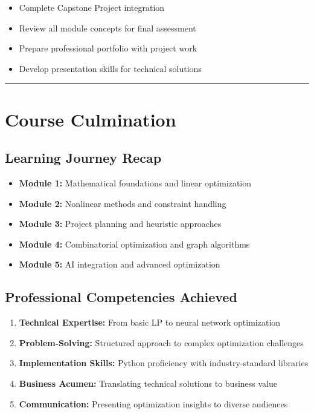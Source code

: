 \documentclass[
  letterpaper,
  DIV=11,
  numbers=noendperiod]{scrreprt}
\providecommand{\tightlist}{%
  \setlength{\itemsep}{0pt}\setlength{\parskip}{0pt}}
\begin{document}
\begin{itemize}
\tightlist
\item
  Complete Capstone Project integration
\item
  Review all module concepts for final assessment
\item
  Prepare professional portfolio with project work
\item
  Develop presentation skills for technical solutions
\end{itemize}

\begin{center}\rule{0.5\linewidth}{0.5pt}\end{center}

\section{Course Culmination}\label{course-culmination}

\subsection{Learning Journey Recap}\label{learning-journey-recap}

\begin{itemize}
\tightlist
\item
  \textbf{Module 1:} Mathematical foundations and linear optimization
\item
  \textbf{Module 2:} Nonlinear methods and constraint handling
\item
  \textbf{Module 3:} Project planning and heuristic approaches
\item
  \textbf{Module 4:} Combinatorial optimization and graph algorithms
\item
  \textbf{Module 5:} AI integration and advanced optimization
\end{itemize}

\subsection{Professional Competencies
Achieved}\label{professional-competencies-achieved}

\begin{enumerate}
\def\labelenumi{\arabic{enumi}.}
\tightlist
\item
  \textbf{Technical Expertise:} From basic LP to neural network
  optimization
\item
  \textbf{Problem-Solving:} Structured approach to complex optimization
  challenges
\item
  \textbf{Implementation Skills:} Python proficiency with
  industry-standard libraries
\item
  \textbf{Business Acumen:} Translating technical solutions to business
  value
\item
  \textbf{Communication:} Presenting optimization insights to diverse
  audiences
\end{enumerate}
\end{document}
